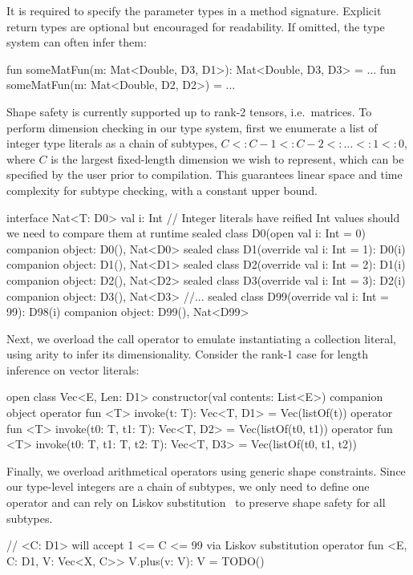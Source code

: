 %
It is required to specify the parameter types in a method signature. Explicit return types are optional but encouraged for readability. If omitted, the type system can often infer them:
%
\begin{kotlinlisting}
fun someMatFun(m: Mat<Double, D3, D1>): Mat<Double, D3, D3> = ...
fun someMatFun(m: Mat<Double, D2, D2>) = ...
\end{kotlinlisting}
%
Shape safety is currently supported up to rank-2 tensors, i.e.\ matrices. To perform dimension checking in our type system, first we enumerate a list of integer type literals as a chain of subtypes, $C <: C - 1 <: C - 2 <: \dots <: 1 <: 0$, where $C$ is the largest fixed-length dimension we wish to represent, which can be specified by the user prior to compilation. This guarantees linear space and time complexity for subtype checking, with a constant upper bound.
\begin{kotlinlisting}[caption={Shape safe tensor addition for rank-1 tensors, $\forall C\leq2.$}]
interface Nat<T: D0> { val i: Int }
// Integer literals have reified Int values should we need to compare them at runtime
sealed class D0(open val i: Int = 0) { companion object: D0(), Nat<D0> }
sealed class D1(override val i: Int = 1): D0(i) { companion object: D1(), Nat<D1> }
sealed class D2(override val i: Int = 2): D1(i) { companion object: D2(), Nat<D2> }
sealed class D3(override val i: Int = 3): D2(i) { companion object: D3(), Nat<D3> } //...
sealed class D99(override val i: Int = 99): D98(i) { companion object: D99(), Nat<D99> }
\end{kotlinlisting}
%
Next, we overload the call operator to emulate instantiating a collection literal, using arity to infer its dimensionality. Consider the rank-1 case for length inference on vector literals:
\begin{kotlinlisting}
open class Vec<E, Len: D1> constructor(val contents: List<E>) {
    companion object {
        operator fun <T> invoke(t: T): Vec<T, D1> = Vec(listOf(t))
        operator fun <T> invoke(t0: T, t1: T): Vec<T, D2> = Vec(listOf(t0, t1))
        operator fun <T> invoke(t0: T, t1: T, t2: T): Vec<T, D3> = Vec(listOf(t0, t1, t2))
    }
}
\end{kotlinlisting}
%
Finally, we overload arithmetical operators using generic shape constraints. Since our type-level integers are a chain of subtypes, we only need to define one operator and can rely on Liskov substitution~\citep{liskov1987} to preserve shape safety for all subtypes.
%
\begin{kotlinlisting}
// <C: D1> will accept 1 <= C <= 99 via Liskov substitution
operator fun <E, C: D1, V: Vec<X, C>> V.plus(v: V): V = TODO()
\end{kotlinlisting}
